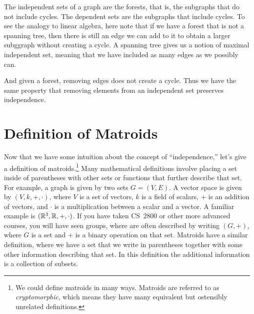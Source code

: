 \documentclass[twoside]{article}
\begin{document}
The independent sets of a graph are the forests, that is, the subgraphs that do not include cycles.
The dependent sets are the subgraphs that include cycles.
To see the analogy to linear algebra, here note that if we have a forest that is not a spanning tree, then there is still an edge we can add to it to obtain a larger subggraph without creating a cycle.
A spanning tree gives us a notion of maximal independent set, meaning that we have included as many edges as we possibly can.

And given a forest, removing edges does not create a cycle.
Thus we have the same property that removing elements from an independent set preserves independence.

\section{Definition of Matroids}

Now that we have some intuition about the concept of ``independence,'' let's give a definition of matroids.\footnote{
  We could define matroids in many ways.
  Matroids are referred to as \emph{cryptomorphic}, which means they have many equivalent but ostensibly unrelated definitions.}
Many mathematical definitions involve placing a set inside of parentheses with other sets or functions that further describe that set.
For example, a graph is given by two sets ${G = (V, E)}$.
A vector space is given by ${(V, k, +, \cdot)}$, where $V$ is a set of vectors, $k$ is a field of scalars, $+$ is an addition of vectors, and $\cdot$ is a multiplication between a scalar and a vector.
A familiar example is ${(\mathbb{R}^3, \mathbb{R}, +, \cdot)}$.
If you have taken CS~$2800$ or other more advanced courses, you will have seen groups, where are often described by writing ${(G, +)}$, where $G$ is a set and $+$ is a binary operation on that set.
Matroids have a similar definition, where we have a set that we write in parentheses together with some other information describing that set.
In this definition the additional information is a collection of subsets.
\end{document}
